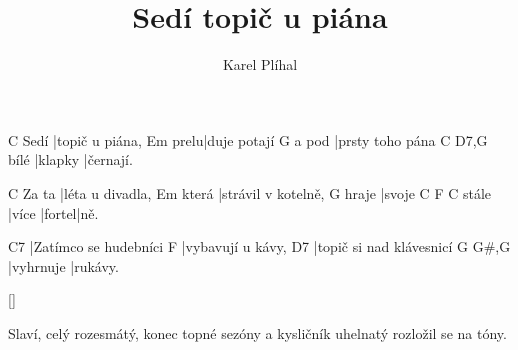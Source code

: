 \documentclass{song}
\title{Sedí topič u piána}
\author{Karel Plíhal}
\begin{document}
     C
Sedí |topič u piána,
     Em
prelu|duje potají
      G
a pod |prsty toho pána
     C       D7,G
bílé |klapky |černají.
\endstrophe

\strophe
      C
Za ta |léta u divadla,
      Em
která |strávil v kotelně,
      G
hraje |svoje 
      C     F      C
stále |více |fortel|ně.
\endstrophe

\strophe
C7
|Zatímco se hudebníci
F
|vybavují u kávy,
D7
|topič si nad klávesnicí
G         G\#,G
|vyhrnuje |rukávy.
\endstrophe

\ref{}

\strophe*
Slaví, celý rozesmátý,
konec topné sezóny
a kysličník uhelnatý
rozložil se na tóny.
\endstrophe
\end{document}
